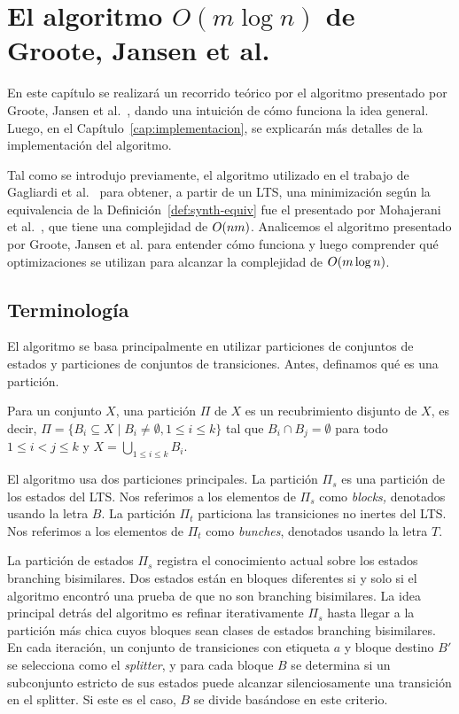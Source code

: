 \chapter{El algoritmo $O(m \log n)$ de Groote, Jansen et al.}
\label{cap:algoritmo}

En este capítulo se realizará un recorrido teórico por el algoritmo presentado por Groote, Jansen et al.~\cite{groote2019}, dando una intuición de cómo funciona la idea general. Luego, en el Capítulo~\ref{cap:implementacion}, se explicarán más detalles de la implementación del algoritmo.

Tal como se introdujo previamente, el algoritmo utilizado en el trabajo de Gagliardi et al.~\cite{compositional} para obtener, a partir de un LTS, una minimización según la equivalencia de la Definición~\ref{def:synth-equiv} fue el presentado por Mohajerani et al.~\cite{wsoe}, que tiene una complejidad de ${O\!\left(nm\right)}$. Analicemos el algoritmo presentado por Groote, Jansen et al. para entender cómo funciona y luego comprender qué optimizaciones se utilizan para alcanzar la complejidad de ${O\!\left(m \log n\right)}$.

\section{Terminología}
\label{sec:terminologia}

El algoritmo se basa principalmente en utilizar particiones de conjuntos de estados y particiones de conjuntos de transiciones. Antes, definamos qué es una partición.

\begin{definition}[Partición]
Para un conjunto $X$, una partición $\Pi$ de $X$ es un recubrimiento disjunto de $X$, es decir, $\Pi=\{ B_i \subseteq X \mid B_i \not= \emptyset, 1\leq i\leq k\}$
tal que $B_i\cap B_j=\emptyset$ para todo $1\leq i<j\leq k$ y $X =\bigcup_{1\leq i\leq k}B_i$.
\end{definition}

El algoritmo usa dos particiones principales.
La partición $\Pi_s$ es una partición de los estados del LTS.
Nos referimos a los elementos de $\Pi_s$ como \textit{blocks,} denotados usando la letra $B$.
La partición $\Pi_t$ particiona las transiciones no inertes del LTS.
Nos referimos a los elementos de $\Pi_t$ como \textit{bunches}, denotados usando la letra $T$.

La partición de estados $\Pi_s$ registra el conocimiento actual sobre los estados branching bisimilares.
Dos estados están en bloques diferentes si y solo si el algoritmo encontró una prueba de que no son branching bisimilares.
La idea principal detrás del algoritmo es refinar iterativamente $\Pi_s$
hasta llegar a la partición más chica cuyos bloques sean clases de estados branching bisimilares.
En cada iteración, un conjunto de transiciones con etiqueta $a$ y bloque destino $B'$ se selecciona como el \emph{splitter},
y para cada bloque $B$ se determina si un subconjunto estricto de sus estados puede alcanzar silenciosamente una transición en el splitter.
Si este es el caso, $B$ se divide basándose en este criterio.

